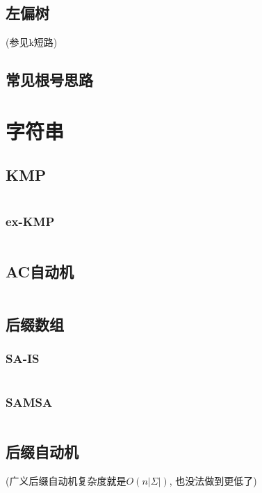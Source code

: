 \documentclass[a4paper]{article}
\begin{document}
\begin{multicols}{2}
			\subsection{左偏树}
				(参见k短路)
	
			\subsection{常见根号思路}
				

		\section{字符串}
			\subsection{KMP}
				\inputminted{cpp}{../src/string/KMP.cpp}
				
				\subsubsection{ex-KMP}
					\inputminted{cpp}{../src/string/exKMP.cpp}

			\subsection{AC自动机}
				\inputminted{cpp}{../src/string/AC自动机.cpp}

			\subsection{后缀数组}
				\subsubsection{SA-IS}
					\inputminted{cpp}{../src/string/sais.cpp}
			
				\subsubsection{SAMSA}
				 	\inputminted{cpp}{../src/string/SAMSA.cpp}



			\subsection{后缀自动机}
				(广义后缀自动机复杂度就是$O\left(n\left|\Sigma\right|\right)$, 也没法做到更低了)
				\inputminted{cpp}{../src/string/后缀自动机.cpp}


\end{multicols}
\end{document}
